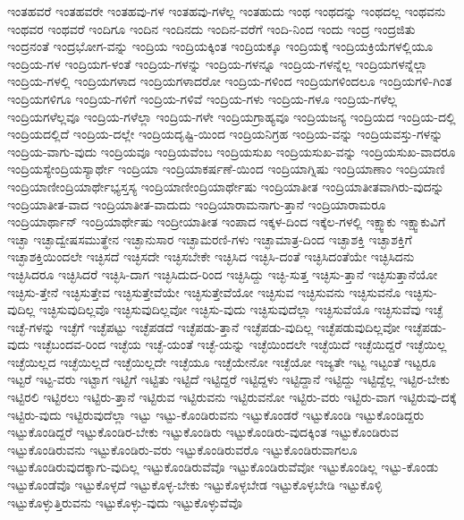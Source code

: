 {ಇಂತಹವರೆ
ಇಂತಹವರೇ
ಇಂತಹವು-ಗಳ
ಇಂತಹವು-ಗಳೆಲ್ಲ
ಇಂತಹುದು
ಇಂಥ
ಇಂಥದನ್ನು
ಇಂಥದಲ್ಲ
ಇಂಥವನು
ಇಂಥವರ
ಇಂಥವರೆ
ಇಂದಿಗೂ
ಇಂದಿನ
ಇಂದಿನದು
ಇಂದಿನ-ವರೆಗೆ
ಇಂದಿ-ನಿಂದ
ಇಂದು
ಇಂದ್ರ
ಇಂದ್ರಜಿತು
ಇಂದ್ರನಂತೆ
ಇಂದ್ರಭೋಗ-ವನ್ನು
ಇಂದ್ರಿಯ
ಇಂದ್ರಿಯಕ್ಕಿಂತ
ಇಂದ್ರಿಯಕ್ಕೂ
ಇಂದ್ರಿಯಕ್ಕೆ
ಇಂದ್ರಿಯಕ್ರಿಯೆಗಳಲ್ಲಿಯೂ
ಇಂದ್ರಿಯ-ಗಳ
ಇಂದ್ರಿಯಗ-ಳಂತೆ
ಇಂದ್ರಿಯ-ಗಳನ್ನು
ಇಂದ್ರಿಯ-ಗಳನ್ನೂ
ಇಂದ್ರಿಯ-ಗಳನ್ನೆಲ್ಲ
ಇಂದ್ರಿಯಗಳನ್ನೆಲ್ಲಾ
ಇಂದ್ರಿಯ-ಗಳಲ್ಲಿ
ಇಂದ್ರಿಯಗಳಾದ
ಇಂದ್ರಿಯಗಳಾದರೋ
ಇಂದ್ರಿಯ-ಗಳಿಂದ
ಇಂದ್ರಿಯಗಳಿಂದಲೂ
ಇಂದ್ರಿಯಗಳಿ-ಗಿಂತ
ಇಂದ್ರಿಯಗಳಿಗೂ
ಇಂದ್ರಿಯ-ಗಳಿಗೆ
ಇಂದ್ರಿಯ-ಗಳಿವೆ
ಇಂದ್ರಿಯ-ಗಳು
ಇಂದ್ರಿಯ-ಗಳೂ
ಇಂದ್ರಿಯ-ಗಳೆಲ್ಲ
ಇಂದ್ರಿಯಗಳೆಲ್ಲವೂ
ಇಂದ್ರಿಯ-ಗಳೆಲ್ಲಾ
ಇಂದ್ರಿಯ-ಗಳೇ
ಇಂದ್ರಿಯಗ್ರಾಹ್ಯವೂ
ಇಂದ್ರಿಯಜನ್ಯ
ಇಂದ್ರಿಯದ
ಇಂದ್ರಿಯ-ದಲ್ಲಿ
ಇಂದ್ರಿಯದಲ್ಲಿದೆ
ಇಂದ್ರಿಯ-ದಲ್ಲೇ
ಇಂದ್ರಿಯದೃಷ್ಟಿ-ಯಿಂದ
ಇಂದ್ರಿಯನಿಗ್ರಹ
ಇಂದ್ರಿಯ-ವನ್ನು
ಇಂದ್ರಿಯವಸ್ತು-ಗಳನ್ನು
ಇಂದ್ರಿಯ-ವಾಗು-ವುದು
ಇಂದ್ರಿಯವೂ
ಇಂದ್ರಿಯವೆಂಬ
ಇಂದ್ರಿಯಸುಖ
ಇಂದ್ರಿಯಸುಖ-ವನ್ನು
ಇಂದ್ರಿಯಸುಖ-ವಾದರೂ
ಇಂದ್ರಿಯಸ್ಯೇಂದ್ರಿಯಸ್ಯಾರ್ಥೇ
ಇಂದ್ರಿಯಾ
ಇಂದ್ರಿಯಾಕರ್ಷಣೆ-ಯಿಂದ
ಇಂದ್ರಿಯಾಗ್ನಿಷು
ಇಂದ್ರಿಯಾಣಾಂ
ಇಂದ್ರಿಯಾಣಿ
ಇಂದ್ರಿಯಾಣೀಂದ್ರಿಯಾರ್ಥೇಭ್ಯಸ್ತಸ್ಯ
ಇಂದ್ರಿಯಾಣೀಂದ್ರಿಯಾರ್ಥೇಷು
ಇಂದ್ರಿಯಾತೀತ
ಇಂದ್ರಿಯಾತೀತವಾಗಿರು-ವುದನ್ನು
ಇಂದ್ರಿಯಾತೀತ-ವಾದ
ಇಂದ್ರಿಯಾತೀತ-ವಾದುದು
ಇಂದ್ರಿಯಾರಾಮನಾಗು-ತ್ತಾನೆ
ಇಂದ್ರಿಯಾರಾಮರೂ
ಇಂದ್ರಿಯಾರ್ಥಾನ್
ಇಂದ್ರಿಯಾರ್ಥೇಷು
ಇಂದ್ರೀಯಾತೀತ
ಇಂಪಾದ
ಇಕ್ಕಳ-ದಿಂದ
ಇಕ್ಕೆಲ-ಗಳಲ್ಲಿ
ಇಕ್ಷ್ವಾಕು
ಇಕ್ಷ್ವಾಕುವಿಗೆ
ಇಚ್ಛಾ
ಇಚ್ಛಾದ್ವೇಷಸಮುತ್ಥೇನ
ಇಚ್ಛಾನುಸಾರ
ಇಚ್ಛಾಮರಣಿ-ಗಳು
ಇಚ್ಛಾಮಾತ್ರ-ದಿಂದ
ಇಚ್ಛಾಶಕ್ತಿ
ಇಚ್ಛಾಶಕ್ತಿಗೆ
ಇಚ್ಛಾಶಕ್ತಿಯಿಂದಲೇ
ಇಚ್ಛಿಸದೆ
ಇಚ್ಛಿಸದೇ
ಇಚ್ಛಿಸಬೇಕೇ
ಇಚ್ಛಿಸಿದ
ಇಚ್ಛಿಸಿ-ದಂತೆ
ಇಚ್ಛಿಸಿದಂತೆಯೇ
ಇಚ್ಛಿಸಿದನು
ಇಚ್ಛಿಸಿದರೂ
ಇಚ್ಛಿಸಿದರೆ
ಇಚ್ಛಿಸಿ-ದಾಗ
ಇಚ್ಛಿಸಿದುದ-ರಿಂದ
ಇಚ್ಛಿಸಿದ್ದು
ಇಚ್ಛಿ-ಸುತ್ತ
ಇಚ್ಛಿಸು-ತ್ತಾನೆ
ಇಚ್ಛಿಸುತ್ತಾನೆಯೋ
ಇಚ್ಛಿಸು-ತ್ತೇನೆ
ಇಚ್ಛಿಸುತ್ತೇವ
ಇಚ್ಛಿಸುತ್ತೇವೆಯೇ
ಇಚ್ಛಿಸುತ್ತೇವೆಯೋ
ಇಚ್ಛಿಸುವ
ಇಚ್ಛಿಸುವನು
ಇಚ್ಛಿಸುವನೊ
ಇಚ್ಛಿಸು-ವುದಿಲ್ಲ
ಇಚ್ಛಿಸುವುದಿಲ್ಲವೊ
ಇಚ್ಛಿಸುವುದಿಲ್ಲವೋ
ಇಚ್ಛಿಸು-ವುದು
ಇಚ್ಛಿಸುವುದೆಲ್ಲಾ
ಇಚ್ಛಿಸುವೆಯೊ
ಇಚ್ಛಿಸುವೆವು
ಇಚ್ಛೆ
ಇಚ್ಛೆ-ಗಳನ್ನು
ಇಚ್ಛೆಗೆ
ಇಚ್ಛೆಪಟ್ಟು
ಇಚ್ಛೆಪಡದೆ
ಇಚ್ಛೆಪಡು-ತ್ತಾನೆ
ಇಚ್ಛೆಪಡು-ವುದಿಲ್ಲ
ಇಚ್ಛೆಪಡುವುದಿಲ್ಲವೋ
ಇಚ್ಛೆಪಡು-ವುದು
ಇಚ್ಛೆಬಂದವ-ರಿಂದ
ಇಚ್ಛೆಯ
ಇಚ್ಛೆ-ಯಂತೆ
ಇಚ್ಛೆ-ಯನ್ನು
ಇಚ್ಛೆಯಿಂದಲೇ
ಇಚ್ಛೆಯಿದೆ
ಇಚ್ಛೆಯಿದ್ದರೆ
ಇಚ್ಛೆಯಿಲ್ಲ
ಇಚ್ಛೆಯಿಲ್ಲದ
ಇಚ್ಛೆಯಿಲ್ಲದೆ
ಇಚ್ಛೆಯಿಲ್ಲದೇ
ಇಚ್ಛೆಯೂ
ಇಚ್ಛೆಯೇನೋ
ಇಚ್ಛೆಯೋ
ಇಜ್ಯತೇ
ಇಟ್ಟ
ಇಟ್ಟಂತೆ
ಇಟ್ಟರೂ
ಇಟ್ಟರೆ
ಇಟ್ಟ-ವರು
ಇಟ್ಟಾಗ
ಇಟ್ಟಿಗೆ
ಇಟ್ಟಿತು
ಇಟ್ಟಿದೆ
ಇಟ್ಟಿದ್ದರೆ
ಇಟ್ಟಿದ್ದಳು
ಇಟ್ಟಿದ್ದಾನೆ
ಇಟ್ಟಿದ್ದು
ಇಟ್ಟಿದ್ದೆಲ್ಲ
ಇಟ್ಟಿರ-ಬೇಕು
ಇಟ್ಟಿರಲಿ
ಇಟ್ಟಿರಲು
ಇಟ್ಟಿರು-ತ್ತಾನೆ
ಇಟ್ಟಿರುವ
ಇಟ್ಟಿರುವನು
ಇಟ್ಟಿರುವನೋ
ಇಟ್ಟಿರು-ವರು
ಇಟ್ಟಿರು-ವಾಗ
ಇಟ್ಟಿರುವು-ದಕ್ಕೆ
ಇಟ್ಟಿರು-ವುದು
ಇಟ್ಟಿರುವುದೆಲ್ಲಾ
ಇಟ್ಟು
ಇಟ್ಟು-ಕೊಂಡಿರುವನು
ಇಟ್ಟುಕೊಂಡರೆ
ಇಟ್ಟುಕೊಂಡಿ
ಇಟ್ಟುಕೊಂಡಿದ್ದರು
ಇಟ್ಟುಕೊಂಡಿದ್ದರೆ
ಇಟ್ಟುಕೊಂಡಿರ-ಬೇಕು
ಇಟ್ಟುಕೊಂಡಿರು
ಇಟ್ಟುಕೊಂಡಿರು-ವುದಕ್ಕಿಂತ
ಇಟ್ಟುಕೊಂಡಿರುವ
ಇಟ್ಟುಕೊಂಡಿರುವನು
ಇಟ್ಟುಕೊಂಡಿರು-ವರು
ಇಟ್ಟುಕೊಂಡಿರುವರೊ
ಇಟ್ಟುಕೊಂಡಿರುವಾಗಲೂ
ಇಟ್ಟುಕೊಂಡಿರುವುದಕ್ಕಾಗು-ವುದಿಲ್ಲ
ಇಟ್ಟುಕೊಂಡಿರುವೆವೊ
ಇಟ್ಟುಕೊಂಡಿರುವೆವೋ
ಇಟ್ಟುಕೊಂಡಿಲ್ಲ
ಇಟ್ಟು-ಕೊಂಡು
ಇಟ್ಟುಕೊಂಡೆವೊ
ಇಟ್ಟುಕೊಳ್ಳದೆ
ಇಟ್ಟುಕೊಳ್ಳ-ಬೇಕು
ಇಟ್ಟುಕೊಳ್ಳಬೇಡ
ಇಟ್ಟುಕೊಳ್ಳಬೇಡಿ
ಇಟ್ಟುಕೊಳ್ಳಿ
ಇಟ್ಟುಕೊಳ್ಳುತ್ತಿರುವನು
ಇಟ್ಟುಕೊಳ್ಳು-ವುದು
ಇಟ್ಟುಕೊಳ್ಳುವೆವೊ
}
